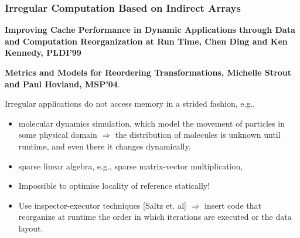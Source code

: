 \documentclass{beamer}
\newcommand{\emp}[1]{\textcolor{DikuRed}{ #1}}
\newcommand{\emphh}[1]{\textcolor{CosGreen}{ #1}}
\begin{document}
\begin{frame}[fragile,t]
  \frametitle{Irregular Computation Based on Indirect Arrays}

{\bf Improving Cache Performance in Dynamic Applications through Data and Computation Reorganization at Run Time, Chen Ding and Ken Kennedy, PLDI'99}\medskip


{\bf Metrics and Models for Reordering Transformations, Michelle Strout and Paul Hovland, MSP'04}.\medskip

Irregular applications do not access memory in a strided fashion, e.g., 
\begin{itemize}
    \item molecular dynamics simulation, which model the movement
            of particles in some physical domain $\Rightarrow$ the
            distribution of molecules is unknown until runtime, and
            even there it changes dynamically.
    \item sparse linear algebra, e.g., sparse matrix-vector multiplication,
    \item \emp{Impossible to optimise locality of reference statically!}
    \item \emphh{Use inspector-executor techniques [Saltz et. al]} $\Rightarrow$
            insert code that reorganize at runtime the order
            in which iterations are executed or the data layout.
\end  {itemize}

\end{frame}
\end{document}

